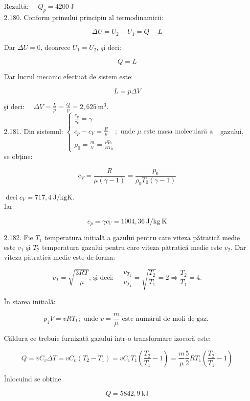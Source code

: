 \documentclass[10pt]{article}
\begin{document}
Rezultă: $\quad Q_{p}=4200 \mathrm{~J}$\\
2.180. Conform primului principiu al termodinamicii:

$$
\Delta U=U_{2}-U_{1}=Q-L
$$

Dar $\Delta U=0$, deoarece $U_{1}=U_{2}$, şi deci:

$$
Q=L
$$

Dar lucrul mecanic efectuat de sistem este:

$$
L=p \Delta V
$$

şi deci: $\quad \Delta V=\frac{L}{p}=\frac{Q}{p}=2,625 \mathrm{~m}^{3}$.\\
2.181. Din sistemul: $\left\{\begin{array}{l}\frac{c_{p}}{c_{V}}=\gamma \\ c_{p}-c_{V}=\frac{R}{\mu} \quad ; \text { unde } \mu \text { este masa moleculară a } \\ \rho_{0}=\frac{m}{V}=\frac{\mu p_{0}}{R T_{0}}\end{array}\right.$ gazului, se obține:

$$
c_{V}=\frac{R}{\mu(\gamma-1)}=\frac{p_{0}}{\rho_{0} T_{0}(\gamma-1)}
$$

$\operatorname{deci} c_{V}=717,4 \mathrm{~J} / \mathrm{kg} \mathrm{K}$.\\
Iar

$$
c_{p}=\gamma c_{V}=1004,36 \mathrm{~J} / \mathrm{kg} \mathrm{~K}
$$

2.182. Fie $T_{1}$ temperatura inițială a gazului pentru care viteza pătratică medie este $v_{1}$ şi $T_{2}$ temperatura gazului pentru care viteza pătratică medie este $v_{2}$. Dar viteza pătratică medie este de forma:

$$
v_{T}=\sqrt{\frac{3 R T}{\mu}} \text {; şi deci: } \quad \frac{v_{T_{2}}}{v_{T_{1}}}=\sqrt{\frac{T_{2}}{T_{1}}}=2 \Rightarrow \frac{T_{2}}{T_{1}}=4 .
$$

În starea inițială:

$$
p_{1} V=v R T_{1} ; \text { unde } v=\frac{m}{\mu} \text { este numărul de moli de gaz. }
$$

Căldura ce trebuie furnizată gazului într-o transformare izocoră este:

$$
Q=v C_{v} \Delta T=v C_{v}\left(T_{2}-T_{1}\right)=v C_{v} T_{1}\left(\frac{T_{2}}{T_{1}}-1\right)=\frac{m}{\mu} \frac{5}{2} R T_{1}\left(\frac{T_{2}}{T_{1}}-1\right)
$$

Înlocuind se obține

$$
Q=5842,9 \mathrm{~kJ}
$$
\end{document}
